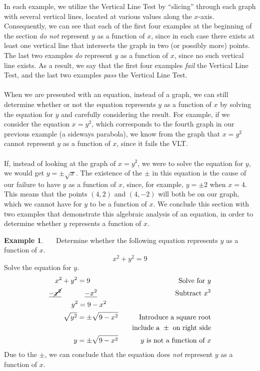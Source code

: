 \documentclass[11pt]{book}
\theoremstyle{definition}  %
\newtheorem{example}{Example}[chapter]
\begin{document}
In each example, we utilize the Vertical Line Test by ``slicing'' through each graph with several vertical lines, located at various values along the $x$-axis.  Consequently, we can see that each of the first four examples at the beginning of the section \textit{do not} represent $y$ as a function of $x$, since in each case there exists at least one vertical line that intersects the graph in two (or possibly more) points.  The last two examples \textit{do} represent $y$ as a function of $x$, since no such vertical line exists.  As a result, we say that the first four examples \textit{fail} the Vertical Line Test, and the last two examples \textit{pass} the Vertical Line Test.\\
~\\
When we are presented with an equation, instead of a graph, we can still determine whether or not the equation represents $y$ as a function of $x$ by solving the equation for $y$ and carefully considering the result.  For example, if we consider the equation $x=y^2$, which corresponds to the fourth graph in our previous example (a sideways parabola), we know from the graph that $x=y^2$ cannot represent $y$ as a function of $x$, since it fails the VLT.~\\
~\\
If, instead of looking at the graph of $x=y^2$, we were to solve the equation for $y$, we would get $y=\pm\sqrt{x}$.  The existence of the $\pm$ in this equation is the cause of our failure to have $y$ as a function of $x$, since, for example, $y=\pm 2$ when $x=4$.  This means that the points $(4,2)$ and $(4,-2)$ will both be on our graph, which we cannot have for $y$ to be a function of $x$.  We conclude this section with two examples that demonstrate this algebraic analysis of an equation, in order to determine whether $y$ represents a function of $x$.
\newpage
\begin{example}~~~Determine whether the following equation represents $y$ as a function of $x$.
$$x^2+y^2=9$$
Solve the equation for $y$.
  \begin{eqnarray*}
    x^2+y^2=9~~~~~~~~~~~~  & & \text{Solve~for~} y\\
    \underline{-\cancel{x^2}}~~~~~~~~~~\underline{-x^2}~~~~~~~~~  & & \text{Subtract~} x^2\\
    y^2=9-x^2~~~~~  & & \\
	  \sqrt{y^2}=\pm\sqrt{9-x^2}  & & \text{Introduce~a~square~root}\\
		& & \text{~~~include a~} \pm \text{~on~right~side}\\
	  y=\pm\sqrt{9-x^2}  & & y \text{~is~not~a~function~of~}x\\
	\end{eqnarray*}
Due to the $\pm$, we can conclude that the equation does \textit{not} represent $y$ as a function of $x$.
\end{example}
\end{document}
